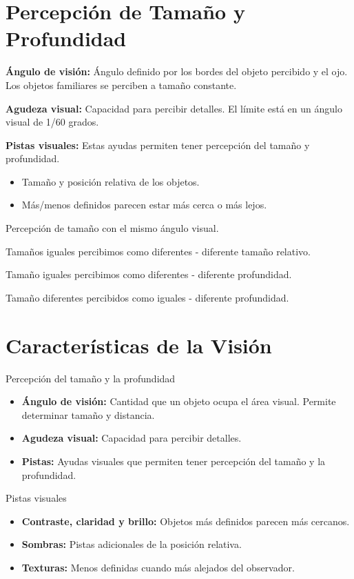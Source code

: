 \section{Percepción de Tamaño y Profundidad}
\textbf{Ángulo de visión:} Ángulo definido por los bordes del objeto percibido y el ojo. Los objetos familiares se perciben a tamaño constante.

\textbf{Agudeza visual:} Capacidad para percibir detalles. El límite está en un ángulo visual de 1/60 grados.

\textbf{Pistas visuales:} Estas ayudas permiten tener percepción del tamaño y profundidad.
\begin{itemize}
	\item Tamaño y posición relativa de los objetos.
	\item Más/menos definidos parecen estar más cerca o más lejos.
\end{itemize}

Percepción de tamaño con el mismo ángulo visual.

Tamaños iguales percibimos como diferentes - diferente tamaño relativo.

Tamaño iguales percibimos como diferentes - diferente profundidad.

Tamaño diferentes percibidos como iguales - diferente profundidad.

\section{Características de la Visión}
Percepción del tamaño y la profundidad
\begin{itemize}
	\item \textbf{Ángulo de visión:} Cantidad que un objeto ocupa el área visual. Permite determinar tamaño y distancia.
	\item \textbf{Agudeza visual:} Capacidad para percibir detalles.
	\item \textbf{Pistas:} Ayudas visuales que permiten tener percepción del tamaño y la profundidad.
\end{itemize}

Pistas visuales
\begin{itemize}
	\item \textbf{Contraste, claridad y brillo:} Objetos más definidos parecen más cercanos.
	\item \textbf{Sombras:} Pistas adicionales de la posición relativa.
	\item \textbf{Texturas:} Menos definidas cuando más alejados del observador.
\end{itemize}
